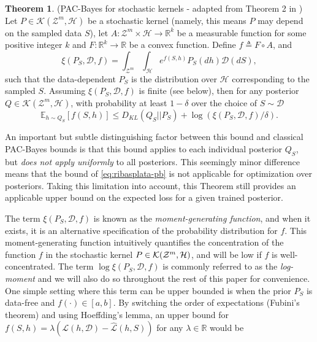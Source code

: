 \documentclass{article} %
\theoremstyle{definition}
\newtheorem{theorem}{Theorem}[section]
\newcommand{\Expect}[2]{\mathbb{E}_{#1}\left [#2 \right ]}
\begin{document}
\begin{theorem} (PAC-Bayes for stochastic kernels - adapted from Theorem 2 in \citet{Rivasplata2020}) \label{thm:rivasplata-pb}
	Let $P\in \mathcal{K}(\mathcal{Z}^m, \mathcal{H})$ be a stochastic kernel (namely, this means $P$ may depend on the sampled data $S$), let $A: \mathcal{Z}^m\times \mathcal{H}\rightarrow \mathbb{R}^k$ be a measurable function for some positive integer $k$ and $F:\mathbb{R}^k\rightarrow \mathbb{R}$ be a convex function.
	Define $f\triangleq F\circ A$, and
	$$
	\xi(P_S, \mathcal{D}, f)=\int_{\mathcal{Z}^m}\int_{\mathcal{H}}e^{f(S, h)}P_S(dh)\mathcal{D}(dS),
	$$
	such that the data-dependent $P_S$ is the distribution over $\mathcal{H}$ corresponding to the sampled $S$. Assuming $\xi(P_S, \mathcal{D}, f)$ is finite (see below), then for any posterior $Q\in \mathcal{K}(\mathcal{Z}^m, \mathcal{H})$, with probability at least $1-\delta$ over the choice of $S\sim \mathcal{D}$
	\begin{equation} \label{eq:ribasplata-pb}
	\Expect{h\sim Q_S}{f(S, h)} \leq D_{KL}(Q_S||P_S)+\log\left (\xi(P_S, \mathcal{D}, f)/\delta\right ) .
	\end{equation}
\end{theorem}

An important but subtle distinguishing factor between this bound and classical PAC-Bayes bounds is that this bound applies to each individual posterior $Q_S$, but \emph{does not apply uniformly} to all posteriors. This seemingly minor difference means that the bound of \eqref{eq:ribasplata-pb} is not applicable for optimization over posteriors. Taking this limitation into account, this Theorem still provides an applicable upper bound on the expected loss for a given trained posterior. 

The term $\xi(P_S, \mathcal{D}, f)$ is known as the \emph{moment-generating function}, and when it exists, it is an alternative specification of the probability distribution for $f$.
This moment-generating function intuitively quantifies the concentration of the function $f$ in the stochastic kernel $P\in{\cal K}({\cal Z}^m,{\cal H})$, and will be low if $f$ is well-concentrated.
The term $\log\xi(P_S, \mathcal{D}, f)$ is commonly referred to as the \emph{log-moment} and we will also do so throughout the rest of this paper for convenience. 
One simple setting where this term can be upper bounded is when the prior $P_S$ is data-free and $f(\cdot)\in[a,b]$. By switching the order of expectations (Fubini's theorem) and using Hoeffding's lemma, an upper bound for $f(S,h)=\lambda(\mathcal{L}(h,\mathcal{D})-\hat{\mathcal{L}}(h, S))$ for any $\lambda\in \mathbb{R}$ would be
\end{document}
